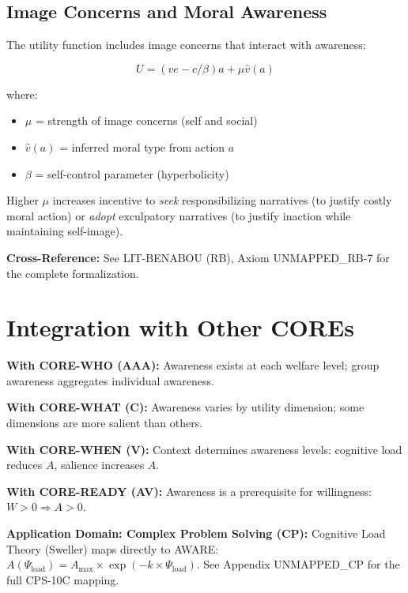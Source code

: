 \subsection{Image Concerns and Moral Awareness}

The utility function includes image concerns that interact with awareness:

\begin{equation}
U = (ve - c/\beta)a + \mu \hat{v}(a)
\end{equation}

where:
\begin{itemize}[nosep]
\item $\mu$ = strength of image concerns (self and social)
\item $\hat{v}(a)$ = inferred moral type from action $a$
\item $\beta$ = self-control parameter (hyperbolicity)
\end{itemize}

Higher $\mu$ increases incentive to \textit{seek} responsibilizing narratives (to justify costly moral action) or \textit{adopt} exculpatory narratives (to justify inaction while maintaining self-image).

\textbf{Cross-Reference:} See LIT-BENABOU (RB), Axiom UNMAPPED_RB-7 for the complete formalization.

\section{Integration with Other COREs}

\begin{tcolorbox}[colback=yellow!5!white, colframe=yellow!75!black,
    title=Integration: CORE-AWARE $\leftrightarrow$ Other COREs]
\textbf{With CORE-WHO (AAA):}
Awareness exists at each welfare level; group awareness aggregates individual awareness.

\textbf{With CORE-WHAT (C):}
Awareness varies by utility dimension; some dimensions are more salient than others.

\textbf{With CORE-WHEN (V):}
Context determines awareness levels: cognitive load reduces $A$, salience increases $A$.

\textbf{With CORE-READY (AV):}
Awareness is a prerequisite for willingness: $W > 0 \Rightarrow A > 0$.

\textbf{Application Domain: Complex Problem Solving (CP):}
Cognitive Load Theory (Sweller) maps directly to AWARE: $A(\Psi_{\text{load}}) = A_{\max} \times \exp(-k \times \Psi_{\text{load}})$. See Appendix UNMAPPED_CP for the full CPS-10C mapping.
\end{tcolorbox}

